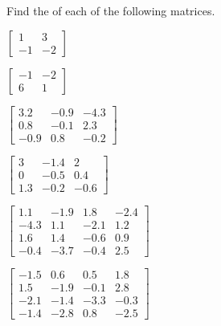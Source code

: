 \begin{exercise}  
Find the  of each of the following matrices.
\begin{Parts}
\item \(\begin{bmatrix} 1&3
\\-1&-2 \end{bmatrix}\)

\item \(\begin{bmatrix} -1&-2
\\6&1 \end{bmatrix}\)

\item \(\begin{bmatrix} 3.2&-0.9&-4.3
\\0.8&-0.1&2.3
\\-0.9&0.8&-0.2 \end{bmatrix}\)

\begin{OmitV1}
\item \(\begin{bmatrix} 3&-1.4&2
\\0&-0.5&0.4
\\1.3&-0.2&-0.6 \end{bmatrix}\)

\item \(\begin{bmatrix} 1.1&-1.9&1.8&-2.4
\\-4.3&1.1&-2.1&1.2
\\1.6&1.4&-0.6&0.9
\\-0.4&-3.7&-0.4&2.5 \end{bmatrix}\)
\end{OmitV1}

\item \(\begin{bmatrix} -1.5&0.6&0.5&1.8
\\1.5&-1.9&-0.1&2.8
\\-2.1&-1.4&-3.3&-0.3
\\-1.4&-2.8&0.8&-2.5 \end{bmatrix}\)
  
\end{Parts}
\end{exercise}







